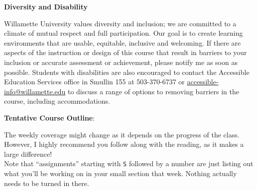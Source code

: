 \documentclass[11pt]{article}
\begin{document}
\textbf{Diversity and Disability}

\hspace{3mm}
\hangindent=5mm Willamette University values diversity and inclusion; we are committed to a climate of mutual respect and full participation. Our goal is to create learning environments that are usable, equitable, inclusive and welcoming. If there are aspects of the instruction or design of this course that result in barriers to your inclusion or accurate assessment or achievement, please notify me as soon as possible. Students with disabilities are also encouraged to contact the Accessible Education Services office in Smullin 155 at 503-370-6737 or \url{accessible-info@willamette.edu} to discuss a range of options to removing barriers in the course, including accommodations.


\newpage

\textbf {\Large Tentative Course Outline}:

The weekly coverage might change as it depends on the progress of the class.  However, I highly recommend you follow along with the reading, as it makes a large difference!\\

Note that ``assignments'' starting with \texttt{S} followed by a number are just listing out what you'll be working on in your small section that week. Nothing actually needs to be turned in there.
\vspace{5mm}
  \footnotesize
  
\end{document}
